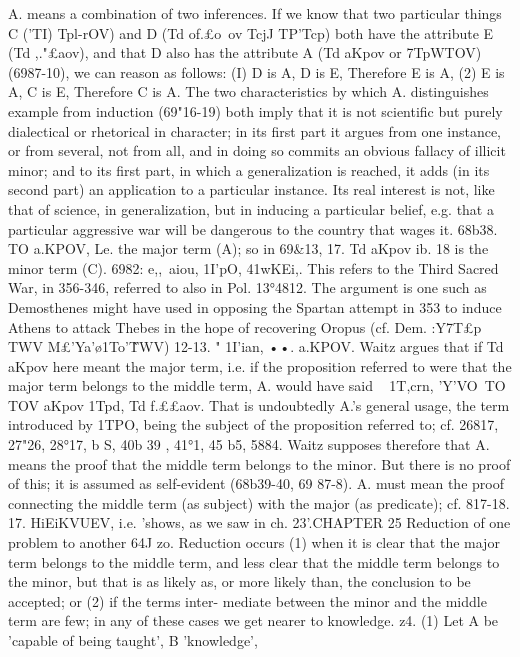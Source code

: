 {{{{{{{{{{{{{{{{{{{{{{{{{A. means a combination of two inferences. If we know that two
particular things C ('TI) Tpl-rOV) and D (Td of.£o~ov TcjJ TP'Tcp) both have
the attribute E (Td ,."£aov), and that D also has the attribute A
(Td aKpov or 7TpWTOV) (6987-10), we can reason as follows: (I) D is
A, D is E, Therefore E is A, (2) E is A, C is E, Therefore C is A.
The two characteristics by which A. distinguishes example from
induction (69"16-19) both imply that it is not scientific but purely
dialectical or rhetorical in character; in its first part it argues
from one instance, or from several, not from all, and in doing so
commits an obvious fallacy of illicit minor; and to its first part,
in which a generalization is reached, it adds (in its second part)
an application to a particular instance. Its real interest is not,
like that of science, in generalization, but in inducing a particular
belief, e.g. that a particular aggressive war will be dangerous to
the country that wages it.
68b38. TO a.KPOV, Le. the major term (A); so in 69&13, 17. Td
aKpov ib. 18 is the minor term (C).
6982: e,,~aiou, 1I'pO, 41wKEi,. This refers to the Third Sacred
War, in 356-346, referred to also in Pol. 13°4812. The argument
is one such as Demosthenes might have used in opposing the
Spartan attempt in 353 to induce Athens to attack Thebes in
the hope of recovering Oropus (cf. Dem. :Y7T£p TWV M£'Ya'\o1To'\~TWV)
12-13. " 1I'ian, ••. a.KPOV. Waitz argues that if Td aKpov here
meant the major term, i.e. if the proposition referred to were that
the major term belongs to the middle term, A. would have said
~ 1T,crn, 'Y'VO~TO TOV aKpov 1Tpd, Td f.££aov. That is undoubtedly A.'s
general usage, the term introduced by 1TPO, being the subject of
the proposition referred to; cf. 26817, 27"26, 28°17, b S, 40b 39 , 41°1,
45 b5, 5884. Waitz supposes therefore that A. means the proof
that the middle term belongs to the minor. But there is no proof
of this; it is assumed as self-evident (68b39-40, 69 87-8). A. must
mean the proof connecting the middle term (as subject) with the
major (as predicate); cf. 817-18.
17. HiEiKVUEV, i.e. 'shows, as we saw in ch. 23'.CHAPTER 25
Reduction of one problem to another
64J zo. Reduction occurs (1) when it is clear that the major
term belongs to the middle term, and less clear that the middle
term belongs to the minor, but that is as likely as, or more likely
than, the conclusion to be accepted; or (2) if the terms inter-
mediate between the minor and the middle term are few; in any
of these cases we get nearer to knowledge.
z4. (1) Let A be 'capable of being taught', B 'knowledge',
}}}}}}}}}}}}}}}}}}}}}}}}}
